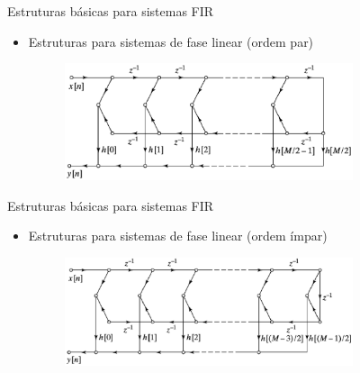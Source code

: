 \begin{slide}{Estruturas básicas para sistemas FIR}
	\begin{itemize}
		\item Estruturas para sistemas de fase linear (ordem par)
   			\begin{figure}
       				\centering
        			\includegraphics[width = 0.8\textwidth]{figs/firlinearphase1.eps}
			\end{figure}
	\end{itemize}
\end{slide}
\begin{slide}{Estruturas básicas para sistemas FIR}
	\begin{itemize}
		\item Estruturas para sistemas de fase linear (ordem ímpar)
   			\begin{figure}
       				\centering
        			\includegraphics[width = 0.8\textwidth]{figs/firlinearphase2.eps}
			\end{figure}
	\end{itemize}
\end{slide}


